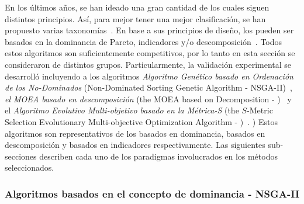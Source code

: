En los últimos años, se han ideado una gran cantidad de \MOEAS{} los cuales siguen distintos principios.
%
Así, para mejor tener una mejor clasificación, se han propuesto varias taxonomías~\cite{Joel:BOOK_MOEAs}.
%
En base a sus principios de diseño, los \MOEAS{} pueden ser basados en la dominancia de Pareto, indicadores y/o descomposición~\cite{pilat2010evolutionary}.
%
Todos estos algoritmos son suficientemente competitivos, por lo tanto en esta sección se consideraron \MOEAS{} de distintos grupos.
%
Particularmente, la validación experimental se desarrolló incluyendo a los algoritmos \textit{Algoritmo Genético basado en Ordenación de los No-Dominados} (Non-Dominated Sorting Genetic Algorithm - NSGA-II)~\cite{Joel:NSGAII}, \textit{el MOEA basado en descomposición} (the MOEA based on Decomposition - \MOEAD{})~\cite{Joel:MOEAD} y el \textit{Algoritmo Evolutivo Multi-objetivo basado en la Métrica-S} (the $S$-Metric Selection Evolutionary Multi-objective Optimization Algorithm - \SMSEMOA{})~\cite{Joel:SMSEMOA}.
)
%
Estos algoritmos son representativos de los basados en dominancia, basados en descomposición y basados en indicadores respectivamente.
%
Las siguientes sub-secciones describen cada uno de los paradigmas involucrados en los métodos seleccionados.

\subsubsection{Algoritmos basados en el concepto de dominancia - NSGA-II }

